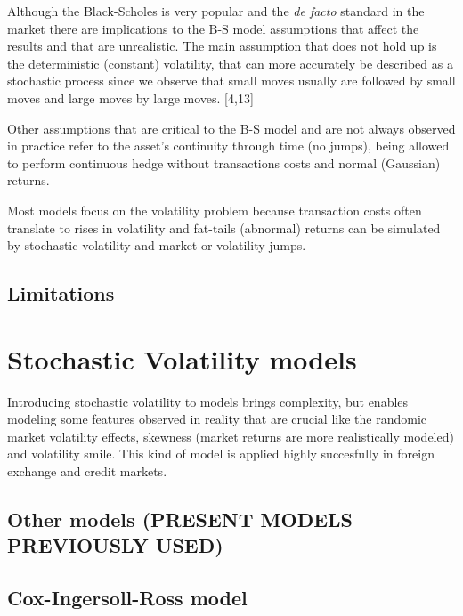 \documentclass[12pt,twoside]{reedthesis}
\theoremstyle{definition}
\theoremstyle{definition}
\theoremstyle{remark}
\begin{document}
  Although the Black-Scholes is very popular and the \emph{de facto}
  standard in the market there are implications to the B-S model
  assumptions that affect the results and that are unrealistic. The main
  assumption that does not hold up is the deterministic (constant)
  volatility, that can more accurately be described as a stochastic
  process since we observe that small moves usually are followed by small
  moves and large moves by large moves. {[}4,13{]}
  
  Other assumptions that are critical to the B-S model and are not always
  observed in practice refer to the asset's continuity through time (no
  jumps), being allowed to perform continuous hedge without transactions
  costs and normal (Gaussian) returns.
  
  Most models focus on the volatility problem because transaction costs
  often translate to rises in volatility and fat-tails (abnormal) returns
  can be simulated by stochastic volatility and market or volatility
  jumps.
  
  \subsection{Limitations}\label{limitations}
  
  \section{Stochastic Volatility
  models}\label{stochastic-volatility-models}
  
  Introducing stochastic volatility to models brings complexity, but
  enables modeling some features observed in reality that are crucial like
  the randomic market volatility effects, skewness (market returns are
  more realistically modeled) and volatility smile. This kind of model is
  applied highly succesfully in foreign exchange and credit markets.
  
  \subsection{Other models (PRESENT MODELS PREVIOUSLY
  USED)}\label{other-models-present-models-previously-used}
  
  \subsection{Cox-Ingersoll-Ross model}\label{cox-ingersoll-ross-model}
  
\end{document}
